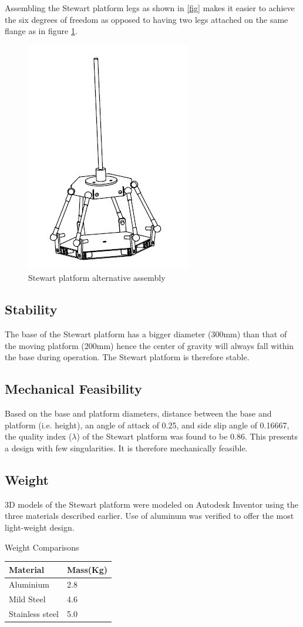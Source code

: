 Assembling the Stewart platform legs as shown in \ref{fig} makes it easier to achieve the six degrees of freedom as opposed to having two legs attached on the same flange as in figure \ref{fig2}.
\begin{center}
\begin{figure}[H]
\centering
\includegraphics[width=0.3\linewidth]{Figures/assembly2}
\caption[Stewart platform assembly]{Stewart platform alternative assembly}
\label{fig2}
\end{figure}
\end{center}
\subsection{Stability}
The base of the Stewart platform has a bigger diameter (300mm) than that of the moving platform (200mm) hence the center of gravity will always fall within the base during operation. The Stewart platform is therefore stable.
\subsection{Mechanical Feasibility}
Based on the base and platform diameters, distance between the base and platform (i.e. height), an angle of attack of 0.25, and side slip angle of 0.16667, the quality index ($\lambda$) of the Stewart platform was found to be 0.86. This presents a design with few singularities. It is therefore mechanically feasible.
\subsection{Weight}
3D models of the Stewart platform were modeled on Autodesk Inventor using the three materials described earlier. Use of aluminum was verified to offer the most light-weight design.
\begin{table}[H]
\caption{Weight Comparisons}
\end{table}
\begin{center}
\begin{tabular}{|l|l|}
\hline
\textbf{Material} & \textbf{Mass(Kg)}\\
\hline
Aluminium & 2.8\\
\hline
Mild Steel & 4.6\\
\hline
Stainless steel & 5.0 \\
\hline
\end{tabular}
\end{center}
